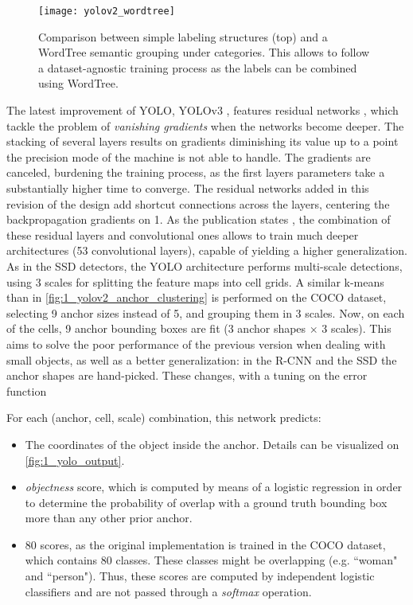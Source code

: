 \begin{figure}[h]
	\centering
	\texttt{[image: yolov2\_wordtree]}
	\caption{Comparison between simple labeling structures (top) and a WordTree semantic grouping under categories. This allows to follow a dataset-agnostic training process as the labels can be combined using WordTree.}
	\label{fig:1_yolov2_wordtree}
\end{figure}



The latest improvement of YOLO, YOLOv3 \cite{yolov3}, features residual networks \cite{resnets}, which tackle the problem of \textit{vanishing gradients} when the networks become deeper. The stacking of several layers results on gradients diminishing its value up to a point the precision mode of the machine is not able to handle. The gradients are canceled, burdening the training process, as the first layers parameters take a substantially higher time to converge. The residual networks added in this revision of the design add shortcut connections across the layers, centering the backpropagation gradients on 1. As the publication states \cite{yolov3}, the combination of these residual layers and convolutional ones allows to train much deeper architectures (53 convolutional layers), capable of yielding a higher generalization. As in the SSD detectors, the YOLO architecture performs multi-scale detections, using 3 scales for splitting the feature maps into cell grids. A similar k-means than in \autoref{fig:1_yolov2_anchor_clustering} is performed on the COCO dataset, selecting 9 anchor sizes instead of 5, and grouping them in 3 scales. Now, on each of the cells, 9 anchor bounding boxes are fit (3 anchor shapes $\times$ 3 scales). This aims to solve the poor performance of the previous version when dealing with small objects, as well as a better generalization: in the R-CNN \cite{rcnn} and the SSD \cite{ssd} the anchor shapes are hand-picked. These changes, with a tuning on the error function

For each (anchor, cell, scale) combination, this network predicts:

\begin{itemize}
	\item The coordinates of the object inside the anchor. Details can be visualized on \autoref{fig:1_yolo_output}.
	
	\item \textit{objectness} score, which is computed by means of a logistic regression in order to determine the probability of overlap with a ground truth bounding box more than any other prior anchor.
	
	\item 80 scores, as the original implementation is trained in the COCO dataset, which contains 80 classes. These classes might be overlapping (e.g. ``woman" and ``person"). Thus, these scores are computed by independent logistic classifiers and are not passed through a \textit{softmax} operation.
\end{itemize}


